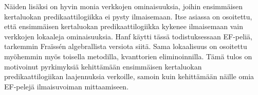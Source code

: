 \documentclass[finnish]{tktltiki2}
\theoremstyle{definition}
\theoremstyle{remark}
\begin{document}
Näiden lisäksi on hyvin monia verkkojen ominaisuuksia, joihin ensimmäisen kertaluokan predikaattilogiikka ei pysty ilmaisemaan. Itse asiassa on osoitettu, että ensimmäisen kertaluokan predikaattilogiikka kykenee ilmaisemaan vain verkkojen lokaaleja ominaisuuksia\cite{Han65}. Hanf käytti tässä todistuksessaan EF-peliä, tarkemmin Fraïssén algebrallista versiota siitä. Sama lokaalisuus on osoitettu myöhemmin myös toisella metodilla, kvanttorien eliminoinnilla\cite{Gai82}. Tämä tulos on motivoinut pyrkimyksiä kehittämään ensimmäisen kertaluokan predikaattilogiikan laajennuksia verkoille, samoin kuin kehittämään näille omia EF-pelejä ilmaisuvoiman mittaamiseen.




 
\newpage
%
%
%
%







% 
\end{document}
